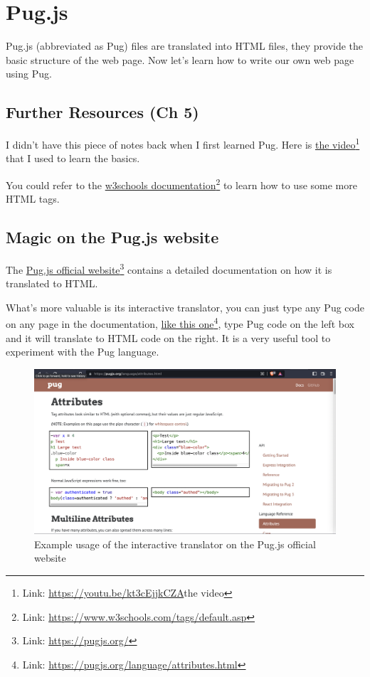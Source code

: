 \chapter{Pug.js}

Pug.js (abbreviated as Pug) files are translated into HTML files, they provide the basic structure of the web page. Now let's learn how to write our own web page using Pug.

\section{Further Resources (Ch 5)}

I didn't have this piece of notes back when I first learned Pug. Here is \href{https://youtu.be/kt3cEjjkCZA}{the video}\footnote{Link: \url{https://youtu.be/kt3cEjjkCZA}{the video}} that I used to learn the basics. 

You could refer to the \href{https://www.w3schools.com/tags/default.asp}{w3schools documentation}\footnote{Link: \url{https://www.w3schools.com/tags/default.asp}} to learn how to use some more HTML tags.

\section{Magic on the Pug.js website}

The \href{{https://pugjs.org/}}{Pug.js official website}\footnote{Link: \url{https://pugjs.org/}} contains a detailed documentation on how it is translated to HTML.

What's more valuable is its interactive translator, you can just type any Pug code on any page in the documentation, \href{https://pugjs.org/language/attributes.html}{like this one}\footnote{Link: \url{https://pugjs.org/language/attributes.html}}, type Pug code on the left box and it will translate to HTML code on the right. It is a very useful tool to experiment with the Pug language.

\begin{figure}[h]
\centering
\includegraphics[width=13cm]{images/ch5-puginteractive.png}
\caption{Example usage of the interactive translator on the Pug.js official website}
\end{figure}

